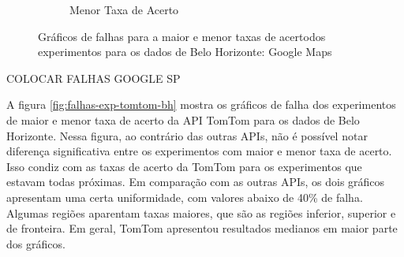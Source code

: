 \begin{figure}[ht]
\begin{subfigure}[b]{0.45\textwidth}
    \caption{Menor Taxa de Acerto}
    \label{fig:falhasgoogleBHexpMenor}
  \end{subfigure}
  
  \caption{Gráficos de falhas para a maior e menor taxas de acertodos experimentos para os dados de Belo Horizonte: Google Maps}
  \label{fig:falhas-exp-google-bh}
\end{figure}

COLOCAR FALHAS GOOGLE SP

A figura \ref{fig:falhas-exp-tomtom-bh} mostra os gráficos de falha dos experimentos de maior e menor taxa de acerto da API TomTom para os dados de Belo Horizonte. Nessa figura, ao contrário das outras APIs, não é possível notar diferença significativa entre os experimentos com maior e menor taxa de acerto. Isso condiz com as taxas de acerto da TomTom para os experimentos que estavam todas próximas. Em comparação com as outras APIs, os dois gráficos apresentam uma certa uniformidade, com valores abaixo de 40\% de falha. Algumas regiões aparentam taxas maiores, que são as regiões inferior, superior e de fronteira. Em geral, TomTom apresentou resultados medianos em maior parte dos gráficos. 


